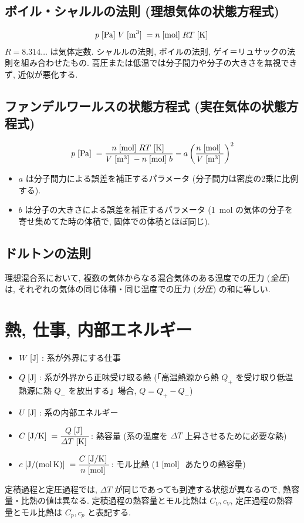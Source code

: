 \documentclass[a4paper,11pt]{jsarticle}
\newcommand{\braunit}[1]{\;\text{[}\unit[per-mode = symbol]{#1}\text{]}\;}
\begin{document}
\subsection{ボイル・シャルルの法則 (理想気体の状態方程式)}
\begin{align*}
  p\braunit{\Pa}V\braunit{\m^3} = n\braunit{\mol}RT\braunit{\K}
\end{align*}
$R=8.314\dots$ は気体定数. シャルルの法則, ボイルの法則, ゲイ＝リュサックの法則を組み合わせたもの. 高圧または低温では分子間力や分子の大きさを無視できず, 近似が悪化する.
\cite[pp.15]{thermo}

\subsection{ファンデルワールスの状態方程式 (実在気体の状態方程式)}
\begin{align*}
  p\braunit{\Pa} = \frac{n\braunit{\mol}RT\braunit{\K}}{V\braunit{\m^3} - n\braunit{\mol}b} - a\left(\frac{n\braunit{\mol}}{V\braunit{\m^3}}\right)^2
\end{align*}
\begin{itemize}
  \item $a$ は分子間力による誤差を補正するパラメータ (分子間力は密度の2乗に比例する).
  \item $b$ は分子の大きさによる誤差を補正するパラメータ (\qty{1}{\mol} の気体の分子を寄せ集めてた時の体積で, 固体での体積とほぼ同じ).
\end{itemize}
\cite[pp.17]{thermo}

\subsection{ドルトンの法則}
理想混合系において, 複数の気体からなる混合気体のある温度での圧力 (\emph{全圧}) は,
それぞれの気体の同じ体積・同じ温度での圧力 (\emph{分圧}) の和に等しい.
\cite[pp.18]{thermo}

\section{熱, 仕事, 内部エネルギー}
\begin{itemize}
  \item $W\braunit{\J}$: 系が外界にする仕事
  \item $Q\braunit{\J}$: 系が外界から正味受け取る熱 (「高温熱源から熱 $Q_+$ を受け取り低温熱源に熱 $Q_-$ を放出する」場合, $Q = Q_+ - Q_-$)
  \item $U\braunit{\J}$: 系の内部エネルギー
  \item $C\braunit{\J\per\K} = \dfrac{Q\braunit{\J}}{\varDelta T\braunit{\K}}$: 熱容量 (系の温度を $\varDelta T$ 上昇させるために必要な熱)
  \item $c\braunit{\J\per\mole\per\K} = \dfrac{C\braunit{\J\per\K}}{n\braunit{\mole}}$: モル比熱 ($1\braunit{\mole}$ あたりの熱容量)
\end{itemize}
定積過程と定圧過程では, $\varDelta T$ が同じであっても到達する状態が異なるので, 熱容量・比熱の値は異なる.
定積過程の熱容量とモル比熱は $C_V, c_V$, 定圧過程の熱容量とモル比熱は $C_p, c_p$ と表記する.
\cite[pp.38]{thermo}
\end{document}
